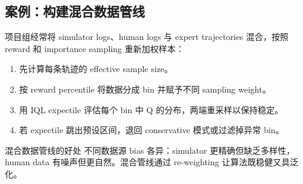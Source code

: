 \subsection{案例：构建混合数据管线}

项目组经常将 simulator logs、human logs 与 expert trajectories 混合，按照 reward 和 importance sampling 重新加权样本：

\begin{enumerate}
    \item 先计算每条轨迹的 effective sample size。
    \item 按 reward percentile 将数据分成 bin 并赋予不同 sampling weight。
    \item 用 IQL expectile 评估每个 bin 中 Q 的分布，两端重采样以保持稳定。
    \item 若 expectile 跳出预设区间，退回 conservative 模式或过滤掉异常 bin。
\end{enumerate}

\begin{knowledgebox}{混合数据管线的好处}
不同数据源 bias 各异：simulator 更精确但缺乏多样性，human data 有噪声但更自然。混合管线通过 re-weighting 让算法既稳健又具泛化。
\end{knowledgebox}

